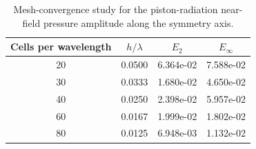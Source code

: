 \begin{table}[htbp]
\centering
\begin{tabular}{cccc}
\hline
Cells per wavelength & $h/\lambda$ & $E_2$ & $E_\infty$ \\
\hline
20 & 0.0500 & 6.364e-02 & 7.588e-02 \\
30 & 0.0333 & 1.680e-02 & 4.650e-02 \\
40 & 0.0250 & 2.398e-02 & 5.957e-02 \\
60 & 0.0167 & 1.999e-02 & 1.802e-02 \\
80 & 0.0125 & 6.948e-03 & 1.132e-02 \\
\hline
\end{tabular}
\caption{Mesh-convergence study for the piston-radiation near-field pressure amplitude along the symmetry axis.}
\label{tab:pistonConvergence}
\end{table}
